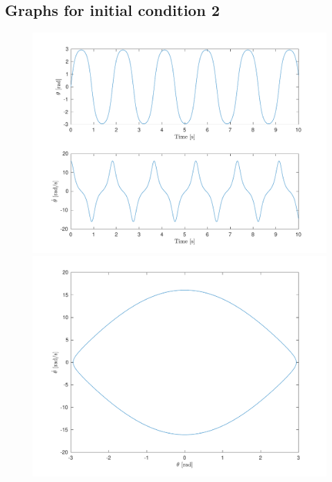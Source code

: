 \documentclass[10pt]{article}
\begin{document}
\subsection{Graphs for initial condition 2}
\begin{figure}[ht]
    \centering
    \begin{minipage}[b]{0.45\textwidth}
        \centering
        \includegraphics[width=1\linewidth]{lab1/figs/section3_x0_2_state_evolution.pdf}
    \end{minipage}
    \begin{minipage}[b]{0.45\textwidth}
        \centering
        \includegraphics[width=1\linewidth]{lab1/figs/section3_x0_2_state_orbit.pdf}
    \end{minipage}
    
    \label{figure:x_0_2_state_evolution}
\end{figure}
\end{document}

